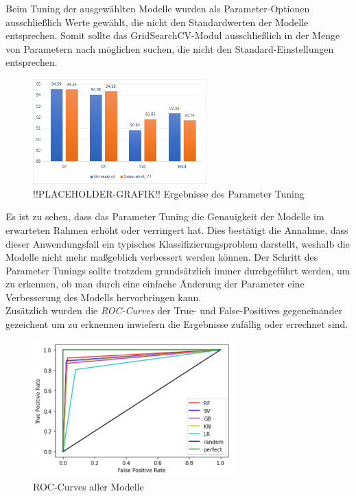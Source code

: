 Beim Tuning der ausgewählten Modelle wurden als Parameter-Optionen ausschließlich Werte gewählt, die nicht 
den Standardwerten der Modelle entsprechen. Somit sollte das GridSearchCV-Modul ausschließlich in der Menge 
von Parametern nach möglichen suchen, die nicht den Standard-Einstellungen entsprechen.

\begin{figure}[h]
    \centering
    \includegraphics[width=0.6\textwidth]{pic/param_eval.png}
    \caption{!!PLACEHOLDER-GRAFIK!! Ergebnisse des Parameter Tuning}
    \label{fig:PT_eval}
\end{figure}

Es ist zu sehen, dass das Parameter Tuning die Genauigkeit der Modelle im erwarteten Rahmen erhöht oder 
verringert hat. Dies bestätigt die Annahme, dass dieser Anwendungsfall ein typisches Klassifizierungsproblem 
darstellt, weshalb die Modelle nicht mehr maßgeblich verbessert werden können. Der Schritt des Parameter Tunings 
sollte trotzdem grundsätzlich immer durchgeführt werden, um zu erkennen, ob man durch eine einfache Änderung 
der Parameter eine Verbesserung des Modells hervorbringen kann.\\

Zusätzlich wurden die \textit{ROC-Curves} der True- und False-Positives gegeneinander gezeichent um zu erknennen 
inwiefern die Ergebnisse zufällig oder errechnet sind.

\begin{figure}[h]
    \centering
    \includegraphics[width=0.7\textwidth]{pic/roc_curves.png}
    \caption{ROC-Curves aller Modelle}
    \label{fig:PT_eval}
\end{figure}

